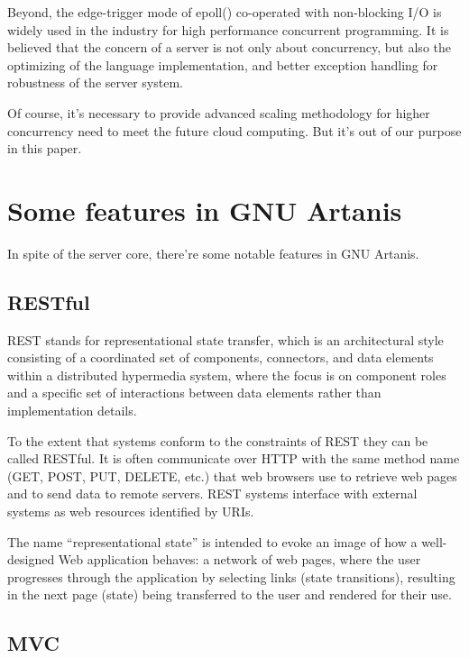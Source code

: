 \documentclass[numbers,numberedpars]{sigplanconf}
\begin{document}
Beyond, the edge-trigger mode of epoll() co-operated with non-blocking I/O is widely used in the industry for high performance concurrent programming.
It is believed that the concern of a server is not only about concurrency, but also the optimizing of the language implementation,
and better exception handling for robustness of the server system.

Of course, it's necessary to provide advanced scaling methodology for higher concurrency need to meet the future cloud computing. But it's
out of our purpose in this paper.

\section{Some features in GNU Artanis} \label{Some features in GNU Artanis}

In spite of the server core, there're some notable features in GNU Artanis.

\subsection{RESTful}

REST stands for representational state transfer, which is an architectural style consisting of a coordinated set of components, connectors,
and data elements within a distributed hypermedia system, where the focus is on component roles and a specific set of interactions between data
elements rather than implementation details.

To the extent that systems conform to the constraints of REST they can be called RESTful. It is often communicate over HTTP with the same method
name (GET, POST, PUT, DELETE, etc.) that web browsers use to retrieve web pages and to send data to remote servers.
REST systems interface with external systems as web resources identified by URIs.

The name ``representational state'' is intended to evoke an image of how a well-designed Web application behaves: a network of web pages,
where the user progresses through the application by selecting links (state transitions), resulting in the next page (state) being transferred to
the user and rendered for their use.



\subsection{MVC}
\end{document}
